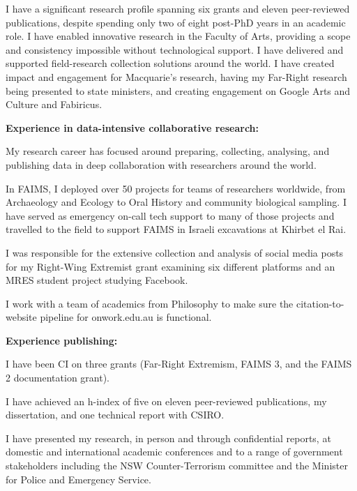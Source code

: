 \documentclass[11pt, a4paper]{awesome-cv}
\begin{document}
\begin{cvletter}


I have a significant research profile spanning six grants and eleven peer-reviewed publications, despite spending only two of eight post-PhD years in an academic role. I have enabled innovative research in the Faculty of Arts, providing a scope and consistency impossible without technological support. I have delivered and supported field-research collection solutions around the world. I have created impact and engagement for Macquarie's research, having my Far-Right research being presented to state ministers, and creating engagement on Google Arts and Culture and Fabiricus. 


\textbf{Experience in data-intensive collaborative research:} 
\begin{letteritems}
\item {My research career has focused around preparing, collecting, analysing, and publishing data in deep collaboration with researchers around the world.}
\item {In FAIMS, I deployed over 50 projects for teams of researchers worldwide, from Archaeology and Ecology to Oral History and community biological sampling. I have served as emergency on-call tech support to many of those projects and travelled to the field to support FAIMS in Israeli excavations at Khirbet el Rai.} 
\item {I was responsible for the extensive collection and analysis of social media posts for my Right-Wing Extremist grant examining six different platforms and an MRES student project studying Facebook.} 
\item {I work with a team of academics from Philosophy to make sure the citation-to-website pipeline for onwork.edu.au is functional.}
\end{letteritems}


\textbf{Experience publishing:} 
\begin{letteritems}
\item {I have been CI on three grants (Far-Right Extremism, FAIMS 3, and the FAIMS 2 documentation grant).}
\item {I have achieved an h-index of five on eleven peer-reviewed publications, my dissertation, and one technical report with CSIRO. }
\item {I have presented my research, in person and through confidential reports, at domestic and international academic conferences and to a range of government stakeholders including the NSW Counter-Terrorism committee and the Minister for Police and Emergency Service.}
\end{letteritems}


\end{cvletter}
\end{document}
